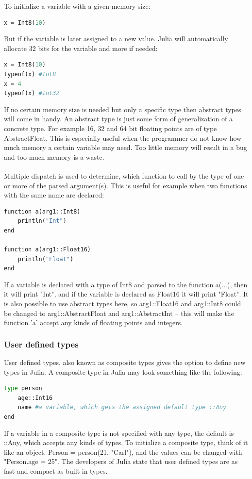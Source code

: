 \documentclass[a4paper, 11pt, titlepage]{article}
\begin{document}
To initialize a variable with a given memory size:
\begin{lstlisting}[language=python]
x = Int8(10)
\end{lstlisting}
But if the variable is later assigned to a new value. Julia will automatically allocate 32 bits for the variable and more if needed:
\begin{lstlisting}[language=python]
x = Int8(10)
typeof(x) #Int8
x = 4
typeof(x) #Int32
\end{lstlisting}
If no certain memory size is needed but only a specific type then abstract types will come in handy. An abstract type is just some form of generalization of a concrete type. For example 16, 32 and 64 bit floating points are of type AbstractFloat. This is especially useful when the programmer do not know how much memory a certain variable may need. Too little memory will result in a bug and too much memory is a waste. 
\\
\\
Multiple dispatch is used to determine, which function to call by the type of one or more of the parsed argument(s). This is useful for example when two functions with the same name are declared:

\begin{lstlisting}[language=python]
function a(arg1::Int8)
	println("Int")  
end

function a(arg1::Float16)  
	println("Float")  
end    
\end{lstlisting}
If a variable is declared with a type of Int8 and parsed to the function a(...), then it will print "Int", and if the variable is declared as Float16 it will print "Float". It is also possible to use abstract types here, so arg1::Float16 and arg1::Int8 could be changed to arg1::AbstractFloat and arg1::AbstractInt – this will make the function 'a' accept any kinds of floating points and integers.  
\subsubsection{User defined types}
User defined types, also known as composite types gives the option to define new types in Julia. A composite type in Julia may look something like the following: 
\begin{lstlisting}[language=python]
type person 
	age::Int16 
	name #a variable, which gets the assigned default type ::Any
end    
\end{lstlisting}
If a variable in a composite type is not specified with any type, the default is ::Any, which accepts any kinds of types. To initialize a composite type, think of it like an object. Person = person(21, "Carl"), and the values can be changed with "Person.age = 25". The developers of Julia state that user defined types are as fast and compact as built in types. 
\end{document}
